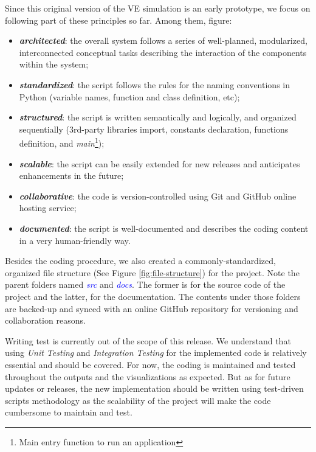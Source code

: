 Since this original version of the VE simulation is an early prototype, we focus on following part of these principles so far. Among them, figure:
\begin{itemize}
    \item \textbf{\textit{architected}}: the overall system follows a series of well-planned, modularized, interconnected conceptual tasks describing the interaction of the components within the system;
    \item \textbf{\textit{standardized}}: the script follows the rules for the naming conventions in Python (variable names, function and class definition, etc);
    \item \textbf{\textit{structured}}: the script is written semantically and logically, and organized sequentially (3rd-party libraries import, constants declaration, functions definition, and \emph{main}\footnote{Main entry function to run an application});
    \item \textbf{\textit{scalable}}: the script can be easily extended for new releases and anticipates enhancements in the future;
    \item \textbf{\textit{collaborative}}: the code is version-controlled using Git and GitHub online hosting service;
    \item \textbf{\textit{documented}}: the script is well-documented and describes the coding content in a very human-friendly way.
\end{itemize}

Besides the coding procedure, we also created a commonly-standardized, organized file structure (See Figure \ref{fig:file-structure}) for the project. Note the parent folders named \textit{\textcolor{blue}{src}} and \textit{\textcolor{blue}{docs}}. The former is for the source code of the project and the latter, for the documentation. The contents under those folders are backed-up and synced with an online GitHub repository for versioning and collaboration reasons.

Writing test is currently out of the scope of this release. We understand that using \emph{Unit Testing} and \emph{Integration Testing} for the implemented code is relatively essential and should be covered. For now, the coding is maintained and tested throughout the outputs and the visualizations as expected. But as for future updates or releases, the new implementation should be written using test-driven scripts methodology as the scalability of the project will make the code cumbersome to maintain and test.

